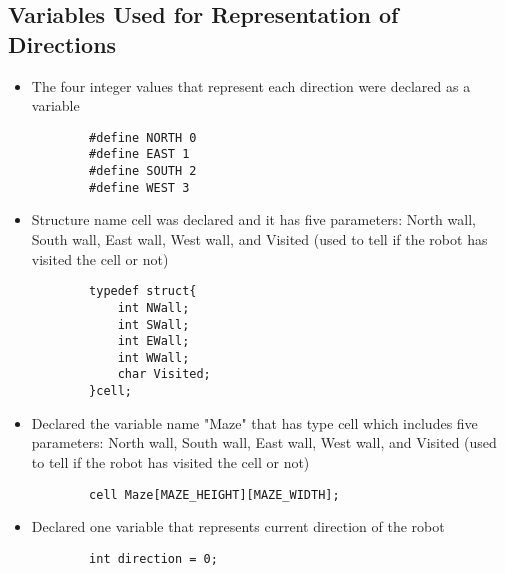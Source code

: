 \documentclass[11pt]{article}
\begin{document}
\subsection{Variables Used for Representation of Directions}
\begin{itemize}
\item The four integer values that represent each direction were declared as a variable 
	\begin{verbatim}
		#define NORTH 0
		#define EAST 1
		#define SOUTH 2
		#define WEST 3
	\end{verbatim}
\item Structure name cell was declared and it has five parameters: North wall, South wall, East wall, West wall, and Visited (used to tell if the robot has visited the cell or not)
	\begin{verbatim}
		typedef struct{
			int NWall;
			int SWall;
			int EWall;
			int WWall;
			char Visited;
		}cell;
	\end{verbatim}
\item Declared the variable name "Maze" that has type cell which includes five parameters: North wall, South wall, East wall, West wall, and Visited (used to tell if the robot has visited the cell or not)
	\begin{verbatim}
		cell Maze[MAZE_HEIGHT][MAZE_WIDTH];
	\end{verbatim}
\item Declared one variable that represents current direction of the robot
	\begin{verbatim}
		int direction = 0;
	\end{verbatim}
\end{itemize}
\end{document}
